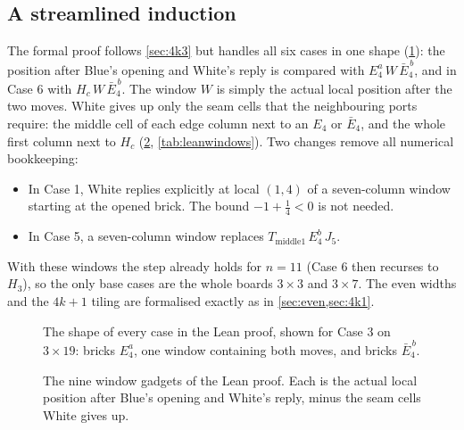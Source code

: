 \documentclass[11pt]{amsart}
\theoremstyle{definition}
\newcommand{\Tm}{T_{\mathrm{middle1}}}
\begin{document}
\subsection*{A streamlined induction}
The formal proof follows \cref{sec:4k3} but handles all six cases in one
shape (\cref{fig:leanscheme}): the position after Blue's opening and White's
reply is compared with $E_4^a\,W\,\bar E_4^{\,b}$, and in Case 6 with
$H_c\,W\,\bar E_4^{\,b}$. The window $W$ is simply the actual local position
after the two moves. White gives up only the seam cells that the neighbouring
ports require: the middle cell of each edge column next to an $E_4$ or
$\bar E_4$, and the whole first column next to $H_c$ (\cref{fig:leanwindows},
\cref{tab:leanwindows}). Two changes remove all numerical bookkeeping:
\begin{itemize}
\item In Case 1, White replies explicitly at local $(1,4)$ of a
seven-column window starting at the opened brick. The bound
$-1+\tfrac14<0$ is not needed.
\item In Case 5, a seven-column window replaces $\Tm\,E_4^b\,J_5$.
\end{itemize}
With these windows the step already holds for $n=11$ (Case 6 then recurses
to $H_3$), so the only base cases are the whole boards $3\times3$ and
$3\times7$. The even widths and the $4k+1$ tiling are formalised exactly as in
\cref{sec:even,sec:4k1}.

\begin{figure}[ht]
\centering
{}
\caption{The shape of every case in the Lean proof, shown for Case 3 on
$3\times19$: bricks $E_4^a$, one window containing both moves, and bricks
$\bar E_4^{\,b}$.}
\label{fig:leanscheme}
\end{figure}

\begin{figure}[ht]
\centering
{}
\caption{The nine window gadgets of the Lean proof. Each is the actual local
position after Blue's opening and White's reply, minus the seam cells White
gives up.}
\label{fig:leanwindows}
\end{figure}
\end{document}
